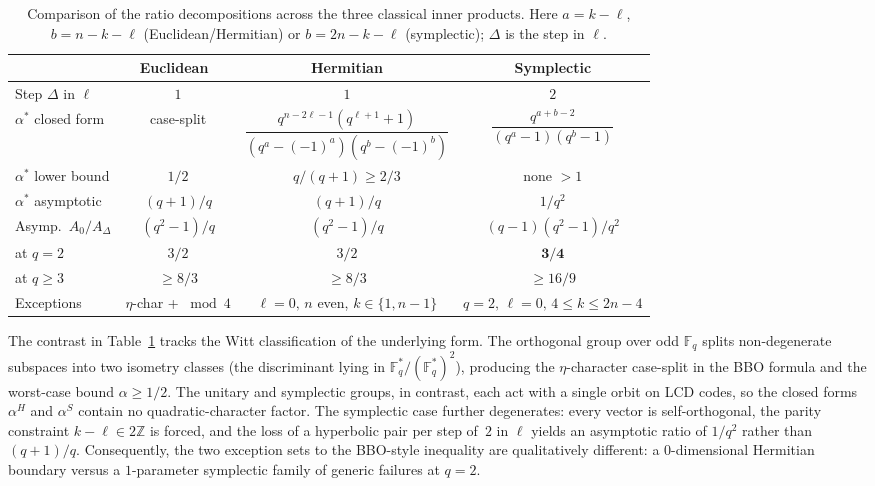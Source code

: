 \documentclass[10pt,a4paper]{amsart}
\newcommand{\F}{\mathbb{F}}
\begin{document}
\begin{table}[h]
\centering
\footnotesize
\caption{Comparison of the ratio decompositions across the three classical
inner products. Here $a = k - \ell$, $b = n - k - \ell$ (Euclidean/Hermitian)
or $b = 2n - k - \ell$ (symplectic); $\Delta$ is the step in $\ell$.}
\label{tab:comparison}
\setlength{\tabcolsep}{2pt}
\begin{tabular}{l|c|c|c}
\toprule
& Euclidean~\cite{BBOz2026} & Hermitian & Symplectic \\
\midrule
Step $\Delta$ in $\ell$ & $1$ & $1$ & $2$ \\[2pt]
$\alpha^*$ closed form &
   case-split &
   $\dfrac{q^{n-2\ell-1}(q^{\ell+1}+1)}{(q^a-(-1)^a)(q^b-(-1)^b)}$ &
   $\dfrac{q^{a+b-2}}{(q^a-1)(q^b-1)}$ \\[6pt]
$\alpha^*$ lower bound & $1/2$ & $q/(q+1) \geq 2/3$ & none $> 1$ \\
$\alpha^*$ asymptotic & $(q+1)/q$ & $(q+1)/q$ & $1/q^2$ \\[2pt]
Asymp.\ $A_0/A_\Delta$ & $(q^2{-}1)/q$ & $(q^2{-}1)/q$ & $(q{-}1)(q^2{-}1)/q^2$ \\
\;at $q = 2$ & $3/2$ & $3/2$ & $\mathbf{3/4}$ \\
\;at $q \geq 3$ & $\geq 8/3$ & $\geq 8/3$ & $\geq 16/9$ \\
\midrule
Exceptions & $\eta$-char + $\bmod 4$ & $\ell{=}0,\,n$ even, $k{\in}\{1,n{-}1\}$ & $q{=}2,\,\ell{=}0,\,4{\leq}k{\leq}2n{-}4$ \\
\bottomrule
\end{tabular}
\end{table}

The contrast in Table~\ref{tab:comparison} tracks the Witt classification
of the underlying form. The orthogonal group over odd $\F_q$ splits
non-degenerate subspaces into two isometry classes (the discriminant lying in
$\F_q^*/(\F_q^*)^2$), producing the $\eta$-character case-split in the BBO
formula and the worst-case bound $\alpha \geq 1/2$. The unitary and symplectic
groups, in contrast, each act with a single orbit on LCD codes, so the closed
forms $\alpha^H$ and $\alpha^S$ contain no quadratic-character factor. The
symplectic case further degenerates: every vector is self-orthogonal, the
parity constraint $k - \ell \in 2\mathbb{Z}$ is forced, and the loss of a
hyperbolic pair per step of~$2$ in $\ell$ yields an asymptotic ratio of
$1/q^2$ rather than $(q+1)/q$. Consequently, the two exception sets to the
BBO-style inequality are qualitatively different: a $0$-dimensional Hermitian
boundary versus a $1$-parameter symplectic family of generic failures at
$q = 2$.
\end{document}
